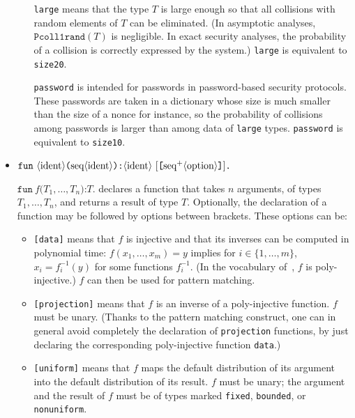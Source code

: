 \begin{itemize}
\begin{itemize}
\begin{enumerate}
\end{enumerate}

\texttt{large} means that the type $T$ is large enough so that
all collisions with random elements of $T$ can be eliminated. 
(In asymptotic analyses, $\texttt{Pcoll1rand}(T)$ is negligible. 
In exact security analyses, the
probability of a collision is correctly expressed by the system.)
\texttt{large} is equivalent to \texttt{size20}.

\texttt{password} is intended for passwords in password-based
security protocols. These passwords are taken in a dictionary whose
size is much smaller than the size of a nonce for instance,
so the probability of collisions among passwords is larger 
than among data of \texttt{large} types.
\texttt{password} is equivalent to \texttt{size10}.

\end{itemize}

\item $\texttt{fun}\ \nonterm{ident}\texttt{(}\seq{ident}\texttt{):}\nonterm{ident}\ [\texttt{[}\neseq{option}\texttt{]}]\texttt{.}$

$\texttt{fun}\ f\texttt{(}T_1, \ldots, T_n\texttt{):}T\texttt{.}$ 
declares a function that takes $n$ arguments, of types $T_1, \ldots, T_n$, 
and returns a result of type $T$.
Optionally, the declaration of a function may be followed by options
between brackets. These options can be:
\begin{itemize}

\item \texttt{[data]} means that $f$ is injective and that its
inverses can be computed in polynomial time: $f(x_1, \ldots, x_m) = y$
implies for $i \in \{1, \ldots, m\}$, $x_i = f_i^{-1}(y)$ for some 
functions $f_i^{-1}$. (In the vocabulary of~\cite{BlanchetEPrint05},
$f$ is poly-injective.) $f$ can then be used for pattern matching.

\item \texttt{[projection]} means that $f$ is an inverse of a poly-injective
function. $f$ must be unary. (Thanks to the pattern matching construct, one can
in general avoid completely the declaration of \texttt{projection} functions,
by just declaring the corresponding poly-injective function \texttt{data}.)

\item \texttt{[uniform]} means that $f$ maps the default distribution
of its argument into the default distribution of its result. $f$ must be unary;
the argument and the result of $f$ must be of types marked 
{\tt fixed}, {\tt bounded}, or {\tt nonuniform}.


\end{itemize}
\end{itemize}
